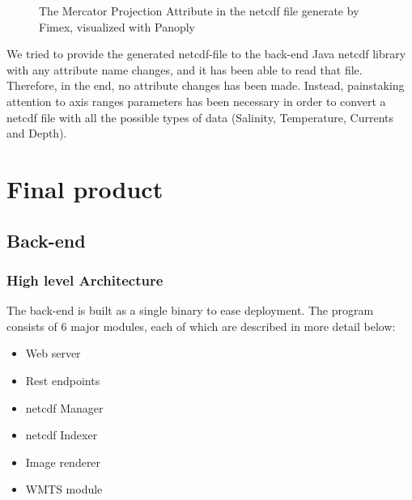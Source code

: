 \documentclass[11pt,a4paper,titlepage,oneside]{report}
\begin{document}
\begin{figure}[!htb]
  \begin{center}
    \caption{The Mercator Projection Attribute in the \gls{netcdf} file generate by Fimex, visualized with Panoply}
    \label{fig:fimexProjMercAttribute}
  \end{center}
\end{figure}

We tried to provide the generated \gls{netcdf}-file to the \gls{back-end} Java \gls{netcdf} library with any attribute name changes, and it has been able to read that file.
Therefore, in the end, no attribute changes has been made. Instead, painstaking attention to axis ranges parameters has been necessary in order to convert a \gls{netcdf} file with all the possible types of data (Salinity, Temperature, Currents and Depth).

\chapter{Final product}
\section{Back-end}
\subsection{High level Architecture}
The \gls{back-end} is built as a single binary to ease deployment. The program consists of 6 major modules, each of which are described in more detail below:
\begin{itemize}
	\item Web server
	\item Rest endpoints
	\item \gls{netcdf} Manager
	\item \gls{netcdf} Indexer
	\item Image renderer
	\item \gls{WMTS} module
\end{itemize}  
\end{document}
